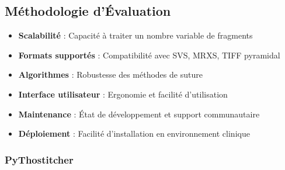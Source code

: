 
\subsection{Méthodologie d'Évaluation}

\begin{tcolorbox}[colback=TechBlue!10, colframe=TechBlue, title=Critères d'Évaluation]
\begin{itemize}[leftmargin=*]
    \item \textbf{Scalabilité} : Capacité à traiter un nombre variable de fragments
    \item \textbf{Formats supportés} : Compatibilité avec SVS, MRXS, TIFF pyramidal
    \item \textbf{Algorithmes} : Robustesse des méthodes de suture
    \item \textbf{Interface utilisateur} : Ergonomie et facilité d'utilisation
    \item \textbf{Maintenance} : État de développement et support communautaire
    \item \textbf{Déploiement} : Facilité d'installation en environnement clinique
\end{itemize}
\end{tcolorbox}

\subsubsection{PyThostitcher}

